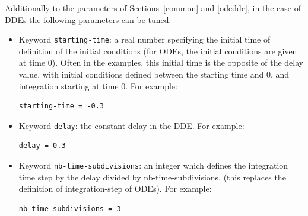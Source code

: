 \documentclass{article}
\begin{document}
Additionally to the parameters of Sections~\ref{common} and \ref{odedde}, in the case of DDEs the following parameters can be tuned:
\begin{itemize}
\item Keyword \texttt{starting-time}: a real number specifying the initial time of definition of the initial conditions (for ODEs, the initial conditions are given at time 0).  Often in the examples, this initial time is the opposite of the delay value,  with initial conditions defined between the starting time and 0, and integration starting at time 0. 
For example:
\begin{verbatim}
starting-time = -0.3
\end{verbatim}
\item Keyword \texttt{delay}: the constant delay in the DDE. 
For example:
\begin{verbatim}
delay = 0.3 
\end{verbatim}
\item Keyword \texttt{nb-time-subdivisions}: an integer which defines the integration time step by the delay divided by nb-time-subdivisions. (this replaces the definition of integration-step of ODEs).
For example:
\begin{verbatim}
nb-time-subdivisions = 3
\end{verbatim}
\end{itemize}
\end{document}
